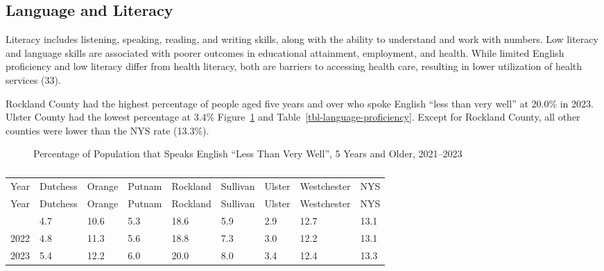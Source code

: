 \documentclass[
  english,
  letterpaper,
]{report}
\begin{document}
\subsection{Language and Literacy}\label{language-and-literacy}

Literacy includes listening, speaking, reading, and writing skills,
along with the ability to understand and work with numbers. Low literacy
and language skills are associated with poorer outcomes in educational
attainment, employment, and health. While limited English proficiency
and low literacy differ from health literacy, both are barriers to
accessing health care, resulting in lower utilization of health services
(33).

Rockland County had the highest percentage of people aged five years and
over who spoke English ``less than very well'' at 20.0\% in 2023. Ulster
County had the lowest percentage at 3.4\%
Figure~\ref{fig-language-proficiency} and
Table~\ref{tbl-language-proficiency}. Except for Rockland County, all
other counties were lower than the NYS rate (13.3\%).

\begin{figure}


\caption{\label{fig-language-proficiency}Percentage of Population that
Speaks English ``Less Than Very Well'', 5 Years and Older, 2021--2023}

\end{figure}%

\begin{longtable}[]{@{}lllllllll@{}}

\caption{\label{tbl-language-proficiency}Percentage of Population that
Speaks English ``Less Than Very Well'', 5 Years and Older, 2021--2023}

\tabularnewline

\caption{}\label{T_53c32}\tabularnewline
\toprule\noalign{}
Year & Dutchess & Orange & Putnam & Rockland & Sullivan & Ulster &
Westchester & NYS \\
\midrule\noalign{}
\endfirsthead
\toprule\noalign{}
Year & Dutchess & Orange & Putnam & Rockland & Sullivan & Ulster &
Westchester & NYS \\
\midrule\noalign{}
\endhead
\bottomrule\noalign{}
\endlastfoot
2021 & 4.7 & 10.6 & 5.3 & 18.6 & 5.9 & 2.9 & 12.7 & 13.1 \\
2022 & 4.8 & 11.3 & 5.6 & 18.8 & 7.3 & 3.0 & 12.2 & 13.1 \\
2023 & 5.4 & 12.2 & 6.0 & 20.0 & 8.0 & 3.4 & 12.4 & 13.3 \\

\end{longtable}
\end{document}
